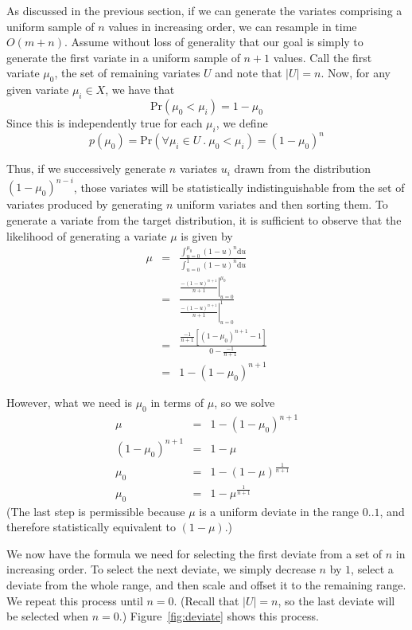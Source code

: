 \documentclass{article}
\newcommand{\Prob}{\text{Pr}}
\newcommand{\du}{{\text{d}u}}
\begin{document}
  As discussed in the previous section, if we can generate
  the variates comprising a uniform sample of $n$ values in
  increasing order, we can resample in time $O(m + n)$.
  Assume without loss of generality that our goal is simply
  to generate the first variate in a uniform sample of $n +
  1$ values.  Call the first variate $\mu_0$, the set of
  remaining variates $U$ and note that $|U|=n$.  Now, for
  any given variate $\mu_i \in X$, we have that
    $$ \Prob(\mu_0 < \mu_i) = 1 - \mu_0 $$
  Since this is independently true for each $\mu_i$, we define
    $$p(\mu_0) = \Prob(\forall \mu_i \in U ~.~ \mu_0 < \mu_i) = (1 - \mu_0)^n$$
  
  Thus, if we successively generate $n$ variates $u_i$ drawn from the
  distribution $(1 - \mu_0)^{n-i}$, those variates will be statistically
  indistinguishable from the set of variates produced by generating $n$
  uniform variates and then sorting them.  To generate a
  variate from the target distribution, it is sufficient to
  observe that the likelihood of generating a variate $\mu$
  is given by
    \begin{eqnarray*}
      \mu &=& \frac{\int_{u=0}^{\mu_0}{(1-u)^n \du}}
                   {\int_{u=0}^{1}{(1-u)^n \du}} \\
	  &=& \frac{\left.\frac{-(1-u)^{n+1}}{n+1}\right|_{u=0}^{\mu_0}}
		   {\left.\frac{-(1-u)^{n+1}}{n+1}\right|_{u=0}^{1}} \\
          &=& \frac{\frac{-1}{n+1}\left[(1-\mu_0)^{n+1}-1\right]}
		   {0-\frac{-1}{n+1}} \\
          &=& 1 - (1 - \mu_0)^{n+1}
    \end{eqnarray*}

  However, what we need is $\mu_0$ in terms of
  $\mu$, so we solve
    \begin{eqnarray*}
       \mu &=& 1 - (1 - \mu_0)^{n+1} \\
       (1 - \mu_0)^{n+1} &=& 1 - \mu \\
       \mu_0 &=& 1 - (1 - \mu)^\frac{1}{n+1} \\
       \mu_0 &=& 1 - \mu^\frac{1}{n+1}
    \end{eqnarray*}
  (The last step is permissible because $\mu$ is a
  uniform deviate in the range $0..1$, and therefore
  statistically equivalent to $(1-\mu)$.)

  We now have the formula we need for selecting the first
  deviate from a set of $n$ in increasing order.  To select
  the next deviate, we simply decrease $n$ by $1$, select a
  deviate from the whole range, and then scale and offset it
  to the remaining range.  We repeat this process until
  $n=0$.  (Recall that $|U|=n$, so the last deviate will be
  selected when $n=0$.)  Figure~\ref{fig:deviate} shows
  this process.
  
\end{document}
